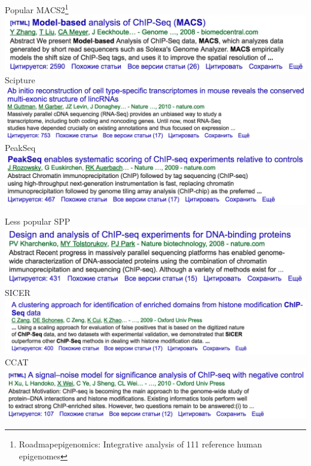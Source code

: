 \documentclass{beamer}
\begin{document}
\begin{frame}{Popular}
MACS2\footnote{Roadmapepigenomics: Integrative analysis of 111 reference human epigenomes}\\
\includegraphics[width=\linewidth]{MACS2.png}\\
Scipture\\
\includegraphics[width=\linewidth]{scripture.png}\\
PeakSeq\\
\includegraphics[width=\linewidth]{peakseq.png}\\
\end{frame}

\begin{frame}{Less popular}
SPP\\
\includegraphics[width=\linewidth]{SPP.png}\\
SICER\\
\includegraphics[width=\linewidth]{SICER.png}\\
CCAT\\
\includegraphics[width=\linewidth]{CCAT.png}\\
\end{frame}
\end{document}
